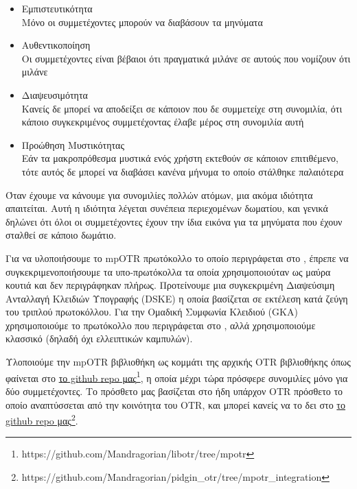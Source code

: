 \begin{itemize}
  \item Εμπιστευτικότητα\\
    Μόνο οι συμμετέχοντες μπορούν να διαβάσουν τα μηνύματα\\[0.2cm]

  \item Αυθεντικοποίηση\\
    Οι συμμετέχοντες είναι βέβαιοι ότι πραγματικά μιλάνε σε αυτούς που νομίζουν ότι μιλάνε\\[0.2cm]

  \item Διαψευσιμότητα\\
    Κανείς δε μπορεί να αποδείξει σε κάποιον που δε συμμετείχε στη συνομιλία, ότι κάποιο συγκεκριμένος συμμετέχοντας έλαβε μέρος στη συνομιλία αυτή\\[0.2cm]

  \item Προώθηση Μυστικότητας\\
    Εάν τα μακροπρόθεσμα μυστικά ενός χρήστη εκτεθούν σε κάποιον επιτιθέμενο, τότε αυτός δε μπορεί να διαβάσει κανένα μήνυμα το οποίο στάλθηκε παλαιότερα\\[0.2cm]

\end{itemize}

Όταν έχουμε να κάνουμε για συνομιλίες πολλών ατόμων, μια ακόμα ιδιότητα απαιτείται.
Αυτή η ιδιότητα λέγεται συνέπεια περιεχομένων δωματίου, και γενικά δηλώνει ότι όλοι οι συμμετέχοντες έχουν την ίδια εικόνα για τα μηνύματα που έχουν σταλθεί σε κάποιο δωμάτιο.

Για να υλοποιήσουμε το mpOTR πρωτόκολλο το οποίο περιγράφεται στο \cite{mpotr}, έπρεπε να συγκεκριμενοποιήσουμε τα υπο-πρωτόκολλα τα οποία χρη\-σι\-μο\-ποι\-ού\-ταν ως μαύρα κουτιά και δεν περιγράφηκαν πλήρως.
Προτείνουμε μια συγκεκριμένη Διαψεύσιμη Ανταλλαγή Κλειδιών Υπογραφής (DSKE) η οποία βασίζεται σε εκτέλεση κατά ζεύγη του τριπλού \dhname πρωτοκόλλου.
Για την Ο\-μα\-δι\-κή Συμφωνία Κλειδιού (GKA) χρησιμοποιούμε το πρωτόκολλο που περιγράφεται στο \cite{mpenc}, αλλά χρησιμοποιούμε κλασσικό \dhname (δηλαδή όχι \dhname ελλειπτικών καμπυλών).

Υλοποιούμε την mpOTR βιβλιοθήκη ως κομμάτι της αρχικής OTR βιβλιοθήκης όπως φαίνεται στο \href{https://github.com/Mandragorian/libotr/tree/mpotr}{το github repo μας\footnote{https://github.com/Mandragorian/libotr/tree/mpotr}}, η οποία μέχρι τώρα πρόσφερε συνομιλίες μόνο για δύο συμμετέχοντες.
Το πρόσθετο μας βασίζεται στο ήδη υπάρχον OTR πρόσθετο το οποίο αναπτύσσεται από την κοινότητα του OTR, και μπορεί κανείς να το δει στο \href{https://github.com/Mandragorian/pidgin_otr/tree/mpotr_integration}{το github repo μας\footnote{https://github.com/Mandragorian/pidgin\_otr/tree/mpotr\_integration}}.


